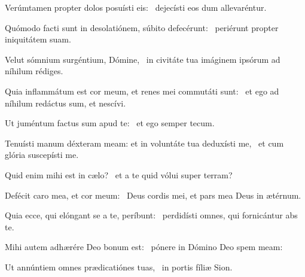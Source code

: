 \item Verúmtamen propter dolos posuísti eis:~\psstar{} dejecísti eos dum allevaréntur.

\item Quómodo facti sunt in desolatiónem, súbito defecérunt:~\psstar{} periérunt propter iniquitátem suam.

\item Velut sómnium surgéntium, Dómine,~\psstar{} in civitáte tua imáginem ipsórum ad níhilum rédiges.

\item Quia inflammátum est cor meum, et renes mei commutáti sunt:~\psstar{} et ego ad níhilum redáctus sum, et nescívi.

\item Ut juméntum factus sum apud te:~\psstar{} et ego semper tecum.

\item Tenuísti manum déxteram meam: et in voluntáte tua deduxísti me,~\psstar{} et cum glória suscepísti me.

\item Quid enim mihi est in cælo?~\psstar{} et a te quid vólui super terram?

\item Defécit caro mea, et cor meum:~\psstar{} Deus cordis mei, et pars mea Deus in ætérnum.

\item Quia ecce, qui elóngant se a te, períbunt:~\psstar{} perdidísti omnes, qui fornicántur abs te.

\item Mihi autem adhærére Deo bonum est:~\psstar{} pónere in Dómino Deo spem meam:

\item Ut annúntiem omnes prædicatiónes tuas,~\psstar{} in portis fíliæ Sion.